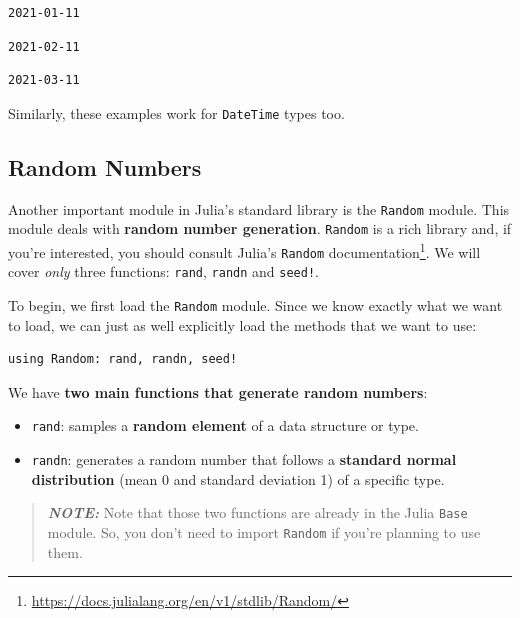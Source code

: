 \documentclass[
  notoc %
]{tufte-book}
\DeclareRobustCommand{\href}[2]{#2\footnote{\url{#1}}}
\providecommand{\tightlist}{%
  \setlength{\itemsep}{0pt}\setlength{\parskip}{0pt}
}
\newcommand{\passthrough}[1]{#1}
\begin{document}
\begin{lstlisting}[language=Output]
2021-01-11
\end{lstlisting}

\begin{lstlisting}[language=Output]
2021-02-11
\end{lstlisting}

\begin{lstlisting}[language=Output]
2021-03-11
\end{lstlisting}

Similarly, these examples work for \passthrough{\lstinline!DateTime!}
types too.

\hypertarget{sec:random}{%
\subsection{Random Numbers}\label{sec:random}}

Another important module in Julia's standard library is the
\passthrough{\lstinline!Random!} module. This module deals with
\textbf{random number generation}. \passthrough{\lstinline!Random!} is a
rich library and, if you're interested, you should consult
\href{https://docs.julialang.org/en/v1/stdlib/Random/}{Julia's
\passthrough{\lstinline!Random!} documentation}. We will cover
\emph{only} three functions: \passthrough{\lstinline!rand!},
\passthrough{\lstinline!randn!} and \passthrough{\lstinline"seed!"}.

To begin, we first load the \passthrough{\lstinline!Random!} module.
Since we know exactly what we want to load, we can just as well
explicitly load the methods that we want to use:

\begin{lstlisting}
using Random: rand, randn, seed!
\end{lstlisting}

We have \textbf{two main functions that generate random numbers}:

\begin{itemize}
\tightlist
\item
  \passthrough{\lstinline!rand!}: samples a \textbf{random element} of a
  data structure or type.
\item
  \passthrough{\lstinline!randn!}: generates a random number that
  follows a \textbf{standard normal distribution} (mean 0 and standard
  deviation 1) of a specific type.
\end{itemize}

\begin{quote}
\textbf{\emph{NOTE:}} Note that those two functions are already in the
Julia \passthrough{\lstinline!Base!} module. So, you don't need to
import \passthrough{\lstinline!Random!} if you're planning to use them.
\end{quote}
\end{document}
